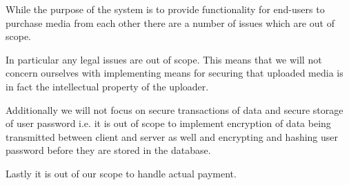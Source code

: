 \documentclass[../report.tex]{subfiles}
\begin{document}
While the purpose of the system is to provide functionality for end-users to purchase media from each other there are a number of issues which are out of scope. 

In particular any legal issues are out of scope. This means that we will not concern ourselves with implementing means for securing that uploaded media is in fact the intellectual property of the uploader. 

Additionally we will not focus on secure transactions of data and secure storage of user password i.e. it is out of scope to implement encryption of data being transmitted between client and server as well and encrypting and hashing user password before they are stored in the database. 

Lastly it is out of our scope to handle actual payment.
\end{document}
